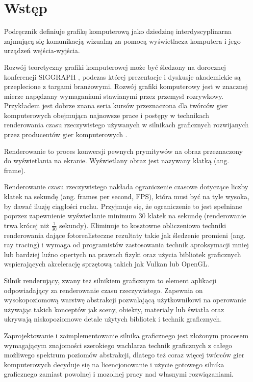 \chapter{Wstęp}
\label{chap:introduction}

Podręcznik \cite{HughesDamEtAl13} definiuje grafikę komputerową jako dziedzinę interdyscyplinarna zajmującą się komunikacją wizualną za pomocą wyświetlacza komputera i jego urządzeń wejścia-wyjścia.

Rozwój teoretyczny grafiki komputerowej może być śledzony na dorocznej konferencji SIGGRAPH \cite{SIGGRAPH}, podczas której prezentacje i dyskusje akademickie są przeplecione z targami branżowymi.
Rozwój grafiki komputerowy jest w znacznej mierze napędzany wymaganiami stawianymi przez przemysł rozrywkowy. Przykładem jest dobrze znana seria kursów przeznaczona dla twórców gier komputerowych obejmująca najnowsze prace i postępy w technikach renderowania czasu rzeczywistego używanych w silnikach graficznych rozwijanych przez producentów gier komputerowych \cite{SIGGRAPH_ADVANCES}.

Renderowanie to proces konwersji pewnych prymitywów na obraz przeznaczony do wyświetlania na ekranie.
Wyświetlany obraz jest nazywany klatką (ang. frame).

Renderowanie czasu rzeczywistego nakłada ograniczenie czasowe dotyczące liczby klatek na sekundę (ang. frames per second, FPS), która musi być na tyle wysoka, by dawać iluzję ciągłości ruchu.
Przyjmuje się, że ograniczenie to jest spełniane poprzez zapewnienie wyświetlanie minimum 30 klatek na sekundę (renderowanie trwa krócej niż $\frac{1}{30}$ sekundy).
Eliminuje to kosztowne obliczeniowo techniki renderowania dające fotorealisteczne rezultaty takie jak śledzenie promieni (ang. ray tracing) i wymaga od programistów zastosowania technik aproksymacji mniej lub bardziej luźno opertych na prawach fizyki oraz użycia bibliotek graficznych wspierających akcelerację sprzętową takich jak Vulkan lub OpenGL.

Silnik renderujący, zwany też silnikiem graficznym to element aplikacji odpowiadający za renderowanie czasu rzeczywistego. Zapewnia on wysokopoziomową warstwę abstrakcji pozwalającą użytkownikowi na operowanie używając takich konceptów jak sceny, obiekty, materiały lub światła oraz ukrywają niskopoziomowe detale użytych bibliotek i technik graficznych.

Zaprojektowanie i zaimplementowanie silnika graficznego jest złożonym procesem wymagającym znajomości szerokiego wachlarza technik graficznych z całego możliwego spektrum poziomów abstrakcji, dlatego też coraz więcej twórców gier komputerowych decyduje się na licencjonowanie i użycie gotowego silnika graficznego zamiast powolnej i mozolnej pracy nad własnymi rozwiązaniami.


